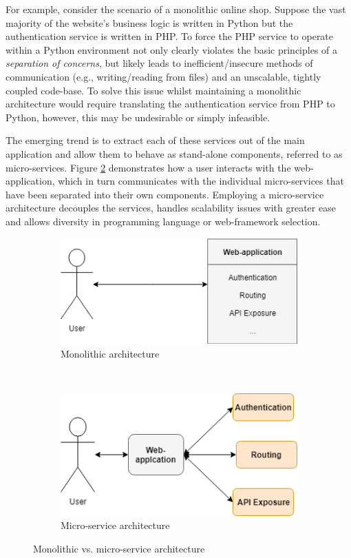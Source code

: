 \documentclass{l4proj}
\begin{document}
For example, consider the scenario of a monolithic online shop. Suppose the vast majority of the website's business logic is written in Python but the authentication service is written in PHP. To force the PHP service to operate within a Python environment not only clearly violates the basic principles of a \textit{separation of concerns}, but likely leads to inefficient/insecure methods of communication (e.g., writing/reading from files) and an unscalable, tightly coupled code-base. To solve this issue whilst maintaining a monolithic architecture would require translating the authentication service from PHP to Python, however, this may be undesirable or simply infeasible.

The emerging trend is to extract each of these services out of the main application and allow them to behave as stand-alone components, referred to as micro-services. Figure \ref{fig:micro} demonstrates how a user interacts with the web-application, which in turn communicates with the individual micro-services that have been separated into their own components. Employing a micro-service architecture decouples the services, handles scalability issues with greater ease and allows diversity in programming language or web-framework selection.

\begin{figure}[h]
	\centering
	\begin{subfigure}[b]{0.3\textwidth}
		\includegraphics[scale=0.35]{images/mono.png}
		\caption{Monolithic architecture}
		\label{fig:mono}
	\end{subfigure}
	~
	\begin{subfigure}[b]{0.3\textwidth}
		\includegraphics[scale=0.35]{images/micro.png}
		\caption{Micro-service architecture}
		\label{fig:micro}
	\end{subfigure}
	\caption{Monolithic vs. micro-service architecture}\label{fig:mono-micro}	
\end{figure}
\end{document}
